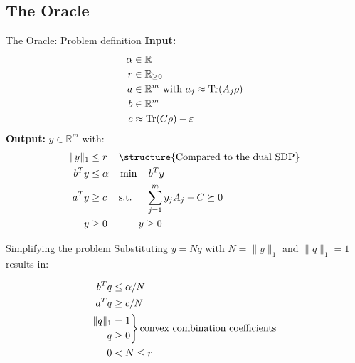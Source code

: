\subsection{The Oracle}

\begin{frame}{The Oracle: Problem definition}
\textbf{Input: }
\begin{align*}
\alpha&\in\mathbb{R}\\
r&\in \mathbb{R}_{\geq 0}\\
a&\in \mathbb{R}^m \text{ with } a_j\approx \operatorname{Tr}(A_j \rho)\\
b&\in \mathbb{R}^m\\
c&\approx \operatorname{Tr}(C\rho)-\varepsilon
\end{align*}
\textbf{Output: } $y\in \mathbb{R}^m$ with:
\begin{align*}
\|y\|_1&\leq r && \text{\structure{Compared to the dual SDP}}\\
b^T y&\leq \alpha&&\min \quad b^T y\\
a^T y&\geq c&&\text{s.t. } \quad \sum_{j=1}^m y_j A_j - C\succeq 0\\
y&\geq 0 && \qquad y\geq 0
\end{align*}

\end{frame}

\begin{frame}{Simplifying the problem}
Substituting $y=Nq$ with $N=\|y\|_1$ and $\|q\|_1=1$ results in:

\begin{equation*}
 \begin{split}
  b^T q&\leq \alpha/N\\
  a^T q&\geq c/N\\
  \begin{aligned}
   \|q\|_1\\
   q
  \end{aligned}
  &
  \begin{rcases*}
   =1\\
   \geq 0
  \end{rcases*} \text{convex combination coefficients}  \\
  0&<N\leq r
 \end{split}
\end{equation*}
\end{frame}

